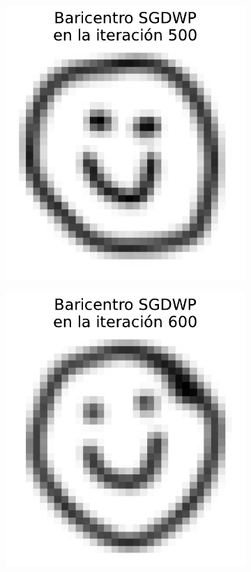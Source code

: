 \begin{figure}[H]
\begin{subfigure}[b]{0.17\textwidth}
        \includegraphics[width=\textwidth]{img/sgdwp-rw/bar-SGDWP-random-walk-iter-05.pdf}
        \label{fig:bar-SGDWP-random-walk-iter-05}
    \end{subfigure}
    \newline
    \begin{subfigure}[b]{0.17\textwidth}
        \centering
        \includegraphics[width=\textwidth]{img/sgdwp-rw/bar-SGDWP-random-walk-iter-06.pdf}

\end{subfigure}
\end{figure}
